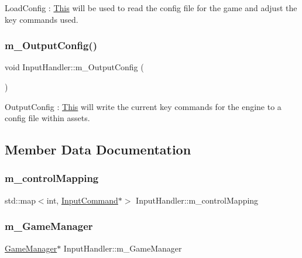 Load\+Config \+: \mbox{\hyperlink{class_this}{This}} will be used to read the config file for the game and adjust the key commands used. \mbox{\label{struct_input_handler_aa133e6d963446578ab282095ca5df05a}} 
\subsubsection{\texorpdfstring{m\+\_\+\+Output\+Config()}{m\_OutputConfig()}}
{\footnotesize\ttfamily void Input\+Handler\+::m\+\_\+\+Output\+Config (\begin{DoxyParamCaption}{ }\end{DoxyParamCaption})\hspace{0.3cm}{\ttfamily [inline]}}

Output\+Config \+: \mbox{\hyperlink{class_this}{This}} will write the current key commands for the engine to a config file within assets. 

\subsection{Member Data Documentation}
\mbox{\label{struct_input_handler_abe853597d11b94e0668c8db6638a0548}} 
\subsubsection{\texorpdfstring{m\+\_\+control\+Mapping}{m\_controlMapping}}
{\footnotesize\ttfamily std\+::map$<$int, \mbox{\hyperlink{class_input_command}{Input\+Command}}$\ast$$>$ Input\+Handler\+::m\+\_\+control\+Mapping}

\mbox{\label{struct_input_handler_ae2a439c9a0559ac885a1322d83cfce4b}} 
\subsubsection{\texorpdfstring{m\+\_\+\+Game\+Manager}{m\_GameManager}}
{\footnotesize\ttfamily \mbox{\hyperlink{class_game_manager}{Game\+Manager}}$\ast$ Input\+Handler\+::m\+\_\+\+Game\+Manager}

